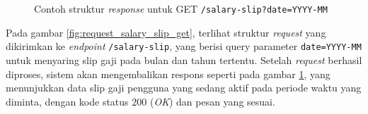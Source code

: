 \begin{figure}
    \centering
    \caption{Contoh struktur \textit{response} untuk GET \texttt{/salary-slip?date=YYYY-MM}}
    \label{fig:response_salary_slip_get}
\end{figure}

Pada gambar \ref{fig:request_salary_slip_get}, terlihat struktur \textit{request} yang dikirimkan ke \textit{endpoint} \texttt{/salary-slip}, yang berisi query parameter \texttt{date=YYYY-MM} untuk menyaring slip gaji pada bulan dan tahun tertentu. Setelah \textit{request} berhasil diproses, sistem akan mengembalikan respons seperti pada gambar \ref{fig:response_salary_slip_get}, yang menunjukkan data slip gaji pengguna yang sedang aktif pada periode waktu yang diminta, dengan kode status 200 (\textit{OK}) dan pesan yang sesuai.

